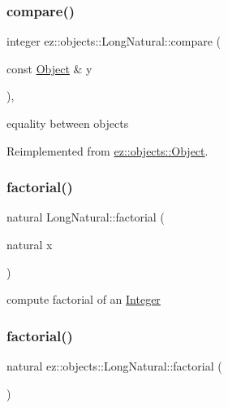 \subsubsection{\texorpdfstring{compare()}{compare()}}
{\footnotesize\ttfamily integer ez\+::objects\+::\+Long\+Natural\+::compare (\begin{DoxyParamCaption}\item[{const \hyperlink{classez_1_1objects_1_1Object}{Object} \&}]{y }\end{DoxyParamCaption})\hspace{0.3cm}{\ttfamily [inline]}, {\ttfamily [virtual]}}

equality between objects 

Reimplemented from \hyperlink{classez_1_1objects_1_1Object_aca311d389dffa204e425463145f4e1e6}{ez\+::objects\+::\+Object}.

\mbox{\label{classez_1_1objects_1_1LongNatural_ae67669fc6851a64143eeab0bc14deae2}} 
\subsubsection{\texorpdfstring{factorial()}{factorial()}\hspace{0.1cm}{\footnotesize\ttfamily [1/2]}}
{\footnotesize\ttfamily natural Long\+Natural\+::factorial (\begin{DoxyParamCaption}\item[{natural}]{x }\end{DoxyParamCaption})\hspace{0.3cm}{\ttfamily [static]}}

compute factorial of an \hyperlink{classez_1_1objects_1_1Integer}{Integer} \mbox{\label{classez_1_1objects_1_1LongNatural_a58617d773cbbfad2a484fd7606972380}} 
\subsubsection{\texorpdfstring{factorial()}{factorial()}\hspace{0.1cm}{\footnotesize\ttfamily [2/2]}}
{\footnotesize\ttfamily natural ez\+::objects\+::\+Long\+Natural\+::factorial (\begin{DoxyParamCaption}{ }\end{DoxyParamCaption})\hspace{0.3cm}{\ttfamily [inline]}}

